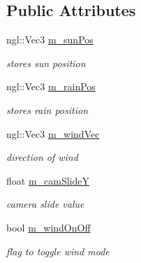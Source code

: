\subsection*{Public Attributes}
\begin{DoxyCompactItemize}
\item 
ngl::Vec3 \hyperlink{classGLWindow_a5cf8db1c199804e46473343a51219dfb}{m\_\-sunPos}
\begin{DoxyCompactList}\small\item\em stores sun position \item\end{DoxyCompactList}\item 
ngl::Vec3 \hyperlink{classGLWindow_a91cc1b7f7a3ecf1781d76dd0c3d16609}{m\_\-rainPos}
\begin{DoxyCompactList}\small\item\em stores rain position \item\end{DoxyCompactList}\item 
ngl::Vec3 \hyperlink{classGLWindow_a7fcaf061ce8a5f9c8ecef97a06e1e6c9}{m\_\-windVec}
\begin{DoxyCompactList}\small\item\em direction of wind \item\end{DoxyCompactList}\item 
float \hyperlink{classGLWindow_a74663d07ad7560d68159c76ce5b750b1}{m\_\-camSlideY}
\begin{DoxyCompactList}\small\item\em camera slide value \item\end{DoxyCompactList}\item 
bool \hyperlink{classGLWindow_af5ed492255bbfea3403731254e2a23f1}{m\_\-windOnOff}
\begin{DoxyCompactList}\small\item\em flag to toggle wind mode \item\end{DoxyCompactList}\end{DoxyCompactItemize}
